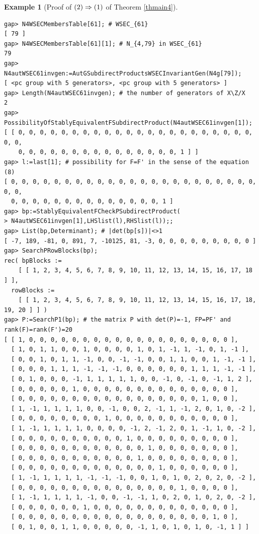 \documentclass{amsart}
\theoremstyle{plain}
\theoremstyle{definition}
\newtheorem{example}[theorem]{Example}
\theoremstyle{remark}
\begin{document}
\begin{example}[Proof of ${\rm (2)}\Rightarrow {\rm (1)}$ of {Theorem \ref{thmain4}}]
\begin{verbatim}
gap> N4WSECMembersTable[61]; # WSEC_{61}
[ 79 ]
gap> N4WSECMembersTable[61][1]; # N_{4,79} in WSEC_{61}
79
gap> N4autWSEC61invgen:=AutGSubdirectProductsWSECInvariantGen(N4g[79]);
[ <pc group with 5 generators>, <pc group with 5 generators> ]
gap> Length(N4autWSEC61invgen); # the number of generators of X\Z/X
2
gap> PossibilityOfStablyEquivalentFSubdirectProduct(N4autWSEC61invgen[1]);
[ [ 0, 0, 0, 0, 0, 0, 0, 0, 0, 0, 0, 0, 0, 0, 0, 0, 0, 0, 0, 0, 0, 0, 0, 0, 
    0, 0, 0, 0, 0, 0, 0, 0, 0, 0, 0, 0, 0, 0, 0, 1 ] ]
gap> l:=last[1]; # possibility for F=F' in the sense of the equation (8)
[ 0, 0, 0, 0, 0, 0, 0, 0, 0, 0, 0, 0, 0, 0, 0, 0, 0, 0, 0, 0, 0, 0, 0, 0, 0, 
  0, 0, 0, 0, 0, 0, 0, 0, 0, 0, 0, 0, 0, 0, 1 ]
gap> bp:=StablyEquivalentFCheckPSubdirectProduct(
> N4autWSEC61invgen[1],LHSlist(l),RHSlist(l));;
gap> List(bp,Determinant); # |det(bp[s])|<>1
[ -7, 189, -81, 0, 891, 7, -10125, 81, -3, 0, 0, 0, 0, 0, 0, 0, 0, 0 ]
gap> SearchPRowBlocks(bp);
rec( bpBlocks := 
    [ [ 1, 2, 3, 4, 5, 6, 7, 8, 9, 10, 11, 12, 13, 14, 15, 16, 17, 18 ] ], 
  rowBlocks := 
    [ [ 1, 2, 3, 4, 5, 6, 7, 8, 9, 10, 11, 12, 13, 14, 15, 16, 17, 18, 19, 20 ] ] )
gap> P:=SearchP1(bp); # the matrix P with det(P)=-1, FP=PF' and rank(F)=rank(F')=20
[ [ 1, 0, 0, 0, 0, 0, 0, 0, 0, 0, 0, 0, 0, 0, 0, 0, 0, 0, 0, 0 ], 
  [ 1, 0, 1, 1, 0, 0, 1, 0, 0, 0, 0, 1, 0, 1, -1, 1, -1, 0, 1, -1 ], 
  [ 0, 0, 1, 0, 1, 1, -1, 0, 0, -1, -1, 0, 0, 1, 1, 0, 0, 1, -1, -1 ], 
  [ 0, 0, 0, 1, 1, 1, -1, -1, -1, 0, 0, 0, 0, 0, 0, 1, 1, 1, -1, -1 ], 
  [ 0, 1, 0, 0, 0, -1, 1, 1, 1, 1, 1, 0, 0, -1, 0, -1, 0, -1, 1, 2 ], 
  [ 0, 0, 0, 0, 0, 1, 0, 0, 0, 0, 0, 0, 0, 0, 0, 0, 0, 0, 0, 0 ], 
  [ 0, 0, 0, 0, 0, 0, 0, 0, 0, 0, 0, 0, 0, 0, 0, 0, 0, 1, 0, 0 ], 
  [ 1, -1, 1, 1, 1, 1, 0, 0, -1, 0, 0, 2, -1, 1, -1, 2, 0, 1, 0, -2 ], 
  [ 0, 0, 0, 0, 0, 0, 0, 0, 1, 0, 0, 0, 0, 0, 0, 0, 0, 0, 0, 0 ], 
  [ 1, -1, 1, 1, 1, 1, 0, 0, 0, 0, -1, 2, -1, 2, 0, 1, -1, 1, 0, -2 ], 
  [ 0, 0, 0, 0, 0, 0, 0, 0, 0, 0, 1, 0, 0, 0, 0, 0, 0, 0, 0, 0 ], 
  [ 0, 0, 0, 0, 0, 0, 0, 0, 0, 0, 0, 0, 1, 0, 0, 0, 0, 0, 0, 0 ], 
  [ 0, 0, 0, 0, 0, 0, 0, 0, 0, 0, 0, 1, 0, 0, 0, 0, 0, 0, 0, 0 ], 
  [ 0, 0, 0, 0, 0, 0, 0, 0, 0, 0, 0, 0, 0, 1, 0, 0, 0, 0, 0, 0 ], 
  [ 1, -1, 1, 1, 1, 1, -1, -1, -1, 0, 0, 1, 0, 1, 0, 2, 0, 2, 0, -2 ], 
  [ 0, 0, 0, 0, 0, 0, 0, 0, 0, 0, 0, 0, 0, 0, 0, 1, 0, 0, 0, 0 ], 
  [ 1, -1, 1, 1, 1, 1, -1, 0, 0, -1, -1, 1, 0, 2, 0, 1, 0, 2, 0, -2 ], 
  [ 0, 0, 0, 0, 0, 0, 1, 0, 0, 0, 0, 0, 0, 0, 0, 0, 0, 0, 0, 0 ], 
  [ 0, 0, 0, 0, 0, 0, 0, 0, 0, 0, 0, 0, 0, 0, 0, 0, 0, 0, 1, 0 ], 
  [ 0, 1, 0, 0, 1, 1, 0, 0, 0, 0, 0, -1, 1, 0, 1, 0, 1, 0, -1, 1 ] ]

\end{verbatim}
\end{example}
\end{document}
